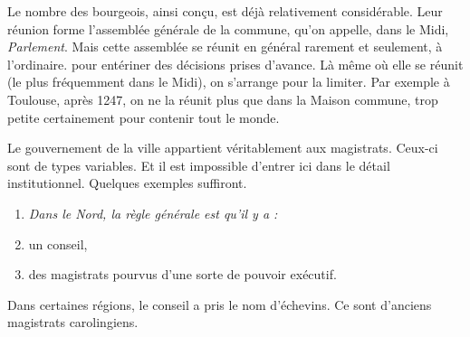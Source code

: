 \documentclass[french,twoside]{book} %
\newlength{\listmod}
\newcommand{\listhead}[1]{\hspace{-1\listmod}\emph{#1}}
\begin{document}
Le nombre des bourgeois, ainsi conçu, est déjà relativement considérable. Leur réunion forme l’assemblée générale de la commune, qu’on appelle, dans le Midi, \emph{Parlement}. Mais cette assemblée se réunit en général rarement et seulement, à l’ordinaire. pour entériner des décisions prises d’avance. Là même où elle se réunit (le plus fréquemment dans le Midi), on s’arrange pour la limiter. Par exemple à Toulouse, après 1247, on ne la réunit plus que dans la Maison commune, trop petite certainement pour contenir tout le monde.\par
Le gouvernement de la ville appartient véritablement aux magistrats. Ceux-ci sont de types variables. Et il est impossible d’entrer ici dans le détail institutionnel. Quelques exemples suffiront.\par

\begin{enumerate}[itemsep=0pt,]
\item[]\listhead{Dans le Nord, la règle générale est qu’il y a :}
\item un conseil,
\item des magistrats pourvus d’une sorte de pouvoir exécutif.

\end{enumerate}\noindent Dans certaines régions, le conseil a pris le nom d’échevins. Ce sont d’anciens magistrats carolingiens.\par
\end{document}
